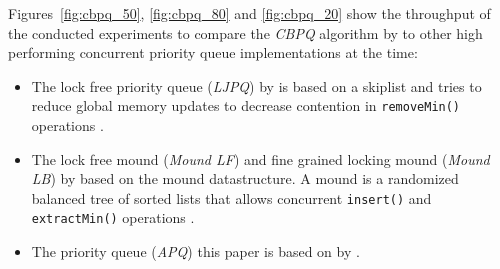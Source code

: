 \newpage
Figures~\ref{fig:cbpq_50}, \ref{fig:cbpq_80} and \ref{fig:cbpq_20} show the throughput of the conducted experiments to compare the \textit{CBPQ} algorithm by \citeauthor{braginsky_cbpq:_2016} to other high performing concurrent priority queue implementations at the time:
\begin{itemize}
	\item The lock free priority queue (\textit{LJPQ}) by \citeauthor{linden_skiplist-based_2013} is  based on a skiplist and tries to reduce global memory updates to decrease contention in \texttt{removeMin()} operations \cite{linden_skiplist-based_2013}.
	\item The lock free mound (\textit{Mound LF}) and fine grained locking mound (\textit{Mound LB}) by \citeauthor{liu_mounds:_2012} based on the mound datastructure. A mound is a randomized balanced tree
	of sorted lists that allows concurrent \texttt{insert()} and \texttt{extractMin()} operations \cite{liu_mounds:_2012}.
	\item The priority queue (\textit{APQ}) this paper is based on by \citeauthor{calciu_adaptive_2014} \cite{calciu_adaptive_2014}.
\end{itemize}

